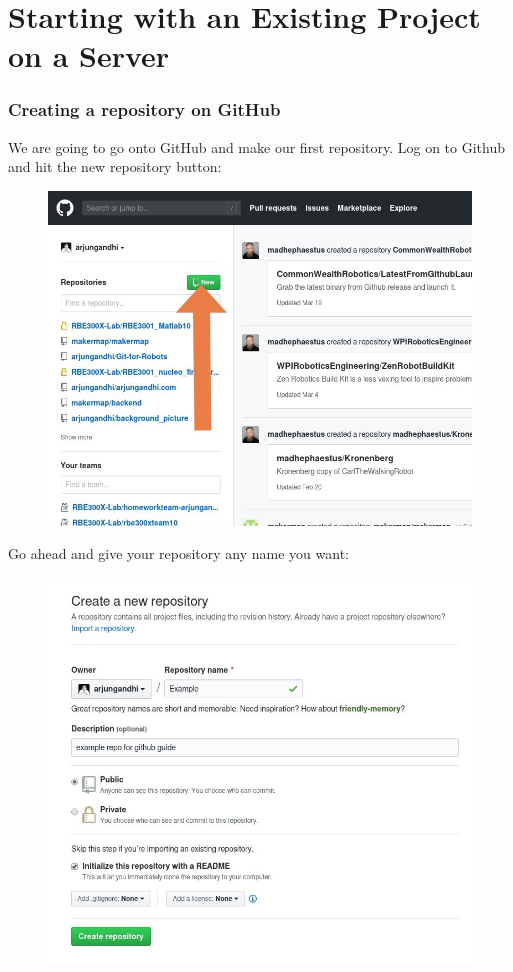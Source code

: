 \documentclass{article}
\begin{document}
\section{Starting with an Existing Project on a Server}

\subsubsection{Creating a repository on GitHub}
We are going to go onto GitHub and make our first repository.
Log on to Github and hit the new repository button:
\begin{figure}[h]
    \centering
    \includegraphics[width=4.5in]{images/new-repo.jpg}
\end{figure}
\newline\newline
Go ahead and give your repository any name you want: 
\begin{figure}[h]
    \centering
    \includegraphics[width=4.5in]{images/new-repo2.jpg}
\end{figure}
\end{document}
